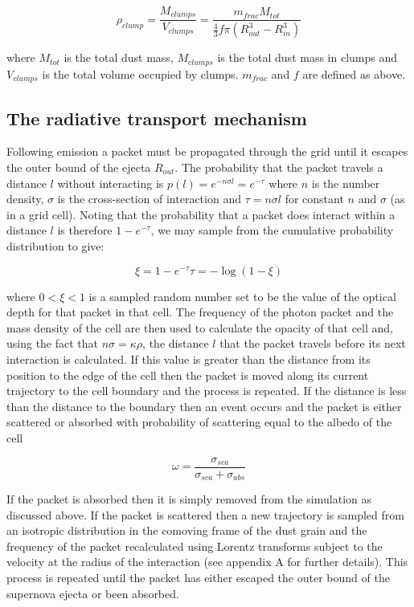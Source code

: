 \documentclass[useAMS,usenatbib,usegraphicx]{mnras}
\begin{document}
\begin{equation}
\rho_{clump}=\frac{M_{clumps}}{V_{clumps}}=\frac{m_{frac}M_{tot}}{\frac{4}{3} f\pi (R_{out}^{3}-R_{in}^{3} )}
\end{equation}

\noindent where $M_{tot}$ is the total dust mass, $M_{clumps}$ is the 
total dust mass in clumps and $V_{clumps}$ is the total volume occupied by 
clumps.  $m_{frac}$ and $f$ are defined as above.


\subsection{The radiative transport mechanism}
\label{transport}

Following emission a packet must be propagated through the grid until it 
escapes the outer bound of the ejecta $R_{out}$.  The probability that the 
packet travels a distance $l$ without interacting is $p(l)=e ^{-n \sigma 
l}=e ^{-\tau} $ where $n$ is the number density, $\sigma$ is the 
cross-section of interaction and $ \tau = n\sigma l$ for constant $n$ and 
$\sigma$ (as in a grid cell).  Noting that the probability that a packet 
does interact within a distance $l$ is therefore $1-e^{-\tau}$, we may 
sample from the cumulative probability distribution to give:

\begin{equation}
\xi = 1 - e^{-\tau}   \tau=-\log (1-\xi)
\end{equation}

\noindent where $0<\xi<1$ is a sampled random number set to be the value 
of the optical depth for that packet in that cell.  The frequency of the 
photon packet and the mass density of the cell are then used to calculate 
the opacity of that cell and, using the fact that $n\sigma=\kappa\rho$, 
the distance $l$ that the packet travels before its next interaction is 
calculated.  If this value is greater than the distance from its position 
to the edge of the cell then the packet is moved along its current 
trajectory to the cell boundary and the process is repeated.  If the 
distance is less than the distance to the boundary then an event occurs 
and the packet is either scattered or absorbed with probability of 
scattering equal to the albedo of the cell

\begin{equation}
	\omega=\frac{\sigma_{sca}}{\sigma_{sca}+\sigma_{abs}}
\end{equation}

If the packet is absorbed then it is simply removed from the simulation as 
discussed above.  If the packet is scattered then a new trajectory is 
sampled from an isotropic distribution in the comoving frame of the dust 
grain and the frequency of the packet recalculated using Lorentz 
transforms subject to the velocity at the radius of the interaction (see 
appendix A for further details).  This process is repeated until the 
packet has either escaped the outer bound of the supernova ejecta or been 
absorbed.
   
\end{document}
